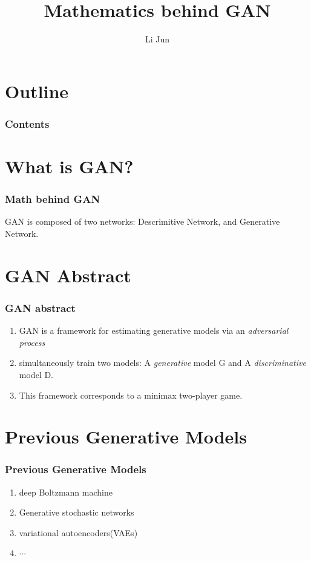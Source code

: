 \documentclass{beamer}[10]
\title{Mathematics behind GAN}
\author{Li Jun}
\begin{document}
\begin{frame}
 \titlepage  
\end{frame}

\section*{Outline}
\begin{frame}
  \frametitle{Contents}
  \tableofcontents
\end{frame}

\section{What is GAN?}
\begin{frame}
  \frametitle{Math behind GAN}
  \begin{definition}
    GAN is composed of two networks: Descrimitive Network, and Generative Network.
  \end{definition}
\end{frame}

\section{GAN Abstract}
\begin{frame}
 \frametitle{GAN abstract}   
 \begin{enumerate}
   \item<1->  GAN is a framework for estimating generative models via an \emph{adversarial process}
   \item<2->  simultaneously train two models: A \emph{generative} model G and A \emph{discriminative} model D. 
   \item<3->  This framework corresponds to a minimax two-player game. 
 \end{enumerate}
\end{frame}

\section{Previous Generative Models}
\begin{frame}
 \frametitle{Previous Generative Models}   
 \begin{enumerate}
   \item<1->  deep Boltzmann machine  
   \item<2->  Generative stochastic networks 
   \item<3->  variational autoencoders(VAEs) 
   \item<4->  $\cdots$
 \end{enumerate}
\end{frame}
\end{document}
